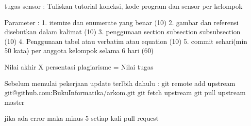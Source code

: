 tugas sensor :
Tuliskan tutorial koneksi, kode program dan sensor per kelompok


Parameter :
1. itemize dan enumerate yang benar (10)
2. gambar dan referensi disebutkan dalam kalimat (10)
3. penggunaan section subsection subsubsection (10)
4. Penggunaan tabel atau verbatim atau equation (10)
5. commit sehari(min 50 kata) per anggota kelompok selama 6 hari (60)

Nilai akhir X persentasi plagiarisme = Nilai tugas

Sebelum memulai pekerjaan update terlbih dahulu :
git remote add upstream git@github.com:BukuInformatika/arkom.git
git fetch upstream
git pull upstream master

jika ada error maka minus 5 setiap kali pull request